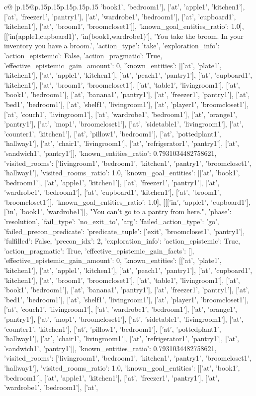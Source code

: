 \documentclass{article}
\begin{document}
{\begin{supertabular}{c@{$\;$}|p{.15\linewidth}@{}p{.15\linewidth}p{.15\linewidth}p{.15\linewidth}p{.15\linewidth}p{.15\linewidth}}
{{{'book1', 'bedroom1'], ['at', 'apple1', 'kitchen1'], ['at', 'freezer1', 'pantry1'], ['at', 'wardrobe1', 'bedroom1'], ['at', 'cupboard1', 'kitchen1'], ['at', 'broom1', 'broomcloset1']], 'known_goal_entities_ratio': 1.0}}], [['in(apple1,cupboard1)', 'in(book1,wardrobe1)'], 'You take the broom. In your inventory you have a broom.', {'action_type': 'take', 'exploration_info': {'action_epistemic': False, 'action_pragmatic': True, 'effective_epistemic_gain_amount': 0, 'known_entities': [['at', 'plate1', 'kitchen1'], ['at', 'apple1', 'kitchen1'], ['at', 'peach1', 'pantry1'], ['at', 'cupboard1', 'kitchen1'], ['at', 'broom1', 'broomcloset1'], ['at', 'table1', 'livingroom1'], ['at', 'book1', 'bedroom1'], ['at', 'banana1', 'pantry1'], ['at', 'freezer1', 'pantry1'], ['at', 'bed1', 'bedroom1'], ['at', 'shelf1', 'livingroom1'], ['at', 'player1', 'broomcloset1'], ['at', 'couch1', 'livingroom1'], ['at', 'wardrobe1', 'bedroom1'], ['at', 'orange1', 'pantry1'], ['at', 'mop1', 'broomcloset1'], ['at', 'sidetable1', 'livingroom1'], ['at', 'counter1', 'kitchen1'], ['at', 'pillow1', 'bedroom1'], ['at', 'pottedplant1', 'hallway1'], ['at', 'chair1', 'livingroom1'], ['at', 'refrigerator1', 'pantry1'], ['at', 'sandwich1', 'pantry1']], 'known_entities_ratio': 0.7931034482758621, 'visited_rooms': ['livingroom1', 'bedroom1', 'kitchen1', 'pantry1', 'broomcloset1', 'hallway1'], 'visited_rooms_ratio': 1.0, 'known_goal_entities': [['at', 'book1', 'bedroom1'], ['at', 'apple1', 'kitchen1'], ['at', 'freezer1', 'pantry1'], ['at', 'wardrobe1', 'bedroom1'], ['at', 'cupboard1', 'kitchen1'], ['at', 'broom1', 'broomcloset1']], 'known_goal_entities_ratio': 1.0}}], [[['in', 'apple1', 'cupboard1'], ['in', 'book1', 'wardrobe1']], "You can't go to a pantry from here.", {'phase': 'resolution', 'fail_type': 'no_exit_to', 'arg': {'failed_action_type': 'go', 'failed_precon_predicate': {'predicate_tuple': ['exit', 'broomcloset1', 'pantry1'], 'fulfilled': False, 'precon_idx': 2}}, 'exploration_info': {'action_epistemic': True, 'action_pragmatic': True, 'effective_epistemic_gain_facts': [], 'effective_epistemic_gain_amount': 0, 'known_entities': [['at', 'plate1', 'kitchen1'], ['at', 'apple1', 'kitchen1'], ['at', 'peach1', 'pantry1'], ['at', 'cupboard1', 'kitchen1'], ['at', 'broom1', 'broomcloset1'], ['at', 'table1', 'livingroom1'], ['at', 'book1', 'bedroom1'], ['at', 'banana1', 'pantry1'], ['at', 'freezer1', 'pantry1'], ['at', 'bed1', 'bedroom1'], ['at', 'shelf1', 'livingroom1'], ['at', 'player1', 'broomcloset1'], ['at', 'couch1', 'livingroom1'], ['at', 'wardrobe1', 'bedroom1'], ['at', 'orange1', 'pantry1'], ['at', 'mop1', 'broomcloset1'], ['at', 'sidetable1', 'livingroom1'], ['at', 'counter1', 'kitchen1'], ['at', 'pillow1', 'bedroom1'], ['at', 'pottedplant1', 'hallway1'], ['at', 'chair1', 'livingroom1'], ['at', 'refrigerator1', 'pantry1'], ['at', 'sandwich1', 'pantry1']], 'known_entities_ratio': 0.7931034482758621, 'visited_rooms': ['livingroom1', 'bedroom1', 'kitchen1', 'pantry1', 'broomcloset1', 'hallway1'], 'visited_rooms_ratio': 1.0, 'known_goal_entities': [['at', 'book1', 'bedroom1'], ['at', 'apple1', 'kitchen1'], ['at', 'freezer1', 'pantry1'], ['at', 'wardrobe1', 'bedroom1'], ['at', }}}
\end{supertabular}}
\end{document}
